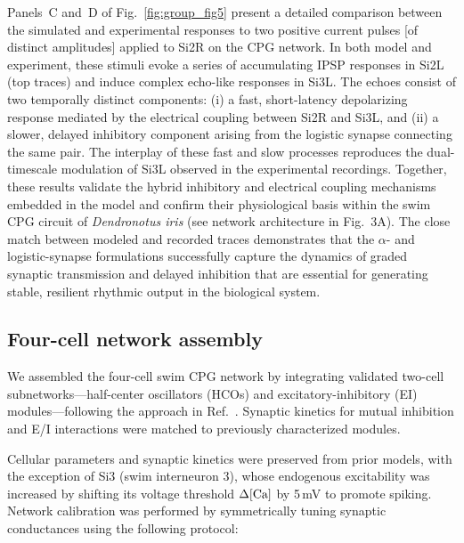 \documentclass[nofootinbib,aip,amsmath,amssymb,reprint,twocolumn,10pt]{revtex4-2}
\begin{document}
Panels~C and~D of Fig.~\ref{fig:group_fig5} present a detailed comparison between the simulated and experimental responses to two positive current pulses [of distinct amplitudes] applied to Si2R on the CPG network. In both model and experiment, these stimuli evoke a series of accumulating IPSP responses in Si2L (top traces) and induce complex echo-like responses in Si3L. The echoes consist of two temporally distinct components: (i) a fast, short-latency depolarizing response mediated by the electrical  coupling between Si2R and Si3L, and (ii) a slower, delayed inhibitory component arising from the logistic synapse connecting the same pair. The interplay of these fast and slow processes reproduces the dual-timescale modulation of Si3L observed in the experimental recordings.
Together, these results validate the hybrid inhibitory and electrical coupling mechanisms embedded in the model and confirm their physiological basis within the swim CPG circuit of {\em Dendronotus iris} (see network architecture in Fig.~3A). The close match between modeled and recorded traces demonstrates that the $\alpha$- and logistic-synapse formulations successfully capture the dynamics of graded synaptic transmission and delayed inhibition that are essential for generating stable, resilient rhythmic output in the biological system.

\subsection{Four-cell network assembly}

We assembled the four-cell swim CPG network by integrating validated two-cell subnetworks---half-center oscillators (HCOs) and excitatory-inhibitory (EI) modules---following the approach in Ref.~\cite{scully2024pairing}. Synaptic kinetics for mutual inhibition and E/I interactions were matched to previously characterized modules.

Cellular parameters and synaptic kinetics were preserved from prior models, with the exception of Si3 (swim interneuron 3), whose endogenous excitability was increased by shifting its voltage threshold $\Delta [\rm Ca]$ by 5\,mV to promote spiking. Network calibration was performed by symmetrically tuning synaptic conductances using the following protocol:
\end{document}
